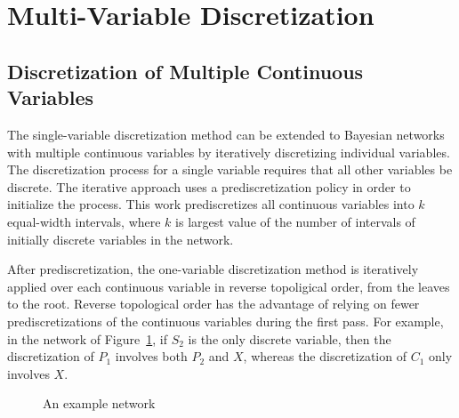 %     
%     


\section{Multi-Variable Discretization}
\label{sec:multi_var}

\subsection{Discretization of Multiple Continuous Variables}

The single-variable discretization method can be extended to Bayesian networks with multiple continuous variables by iteratively discretizing individual variables.
The discretization process for a single variable requires that all other variables be discrete.
The iterative approach uses a prediscretization policy in order to initialize the process.
This work prediscretizes all continuous variables into $k$ equal-width intervals, where $k$ is largest value of the number of intervals of initially discrete variables in the network.

After prediscretization, the one-variable discretization method is iteratively applied over each continuous variable in reverse topoligical order, from the leaves to the root.
Reverse topological order has the advantage of relying on fewer prediscretizations of the continuous variables during the first pass.
For example, in the network of Figure~\ref{fig:example_networks}, if $S_2$ is the only discrete variable, then the discretization of $P_1$ involves both $P_2$ and $X$, whereas the discretization of $C_1$ only involves $X$.

\begin{figure}[ht]
 \centering
     
  \caption{An example network}
   \label{fig:example_networks}
\end{figure}

